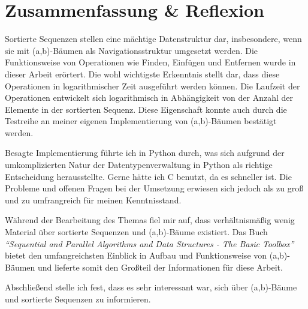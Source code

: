 \chapter{Zusammenfassung \& Reflexion}

Sortierte Sequenzen stellen eine mächtige Datenstruktur dar, insbesondere, wenn sie mit (a,b)-Bäumen als Navigationsstruktur umgesetzt werden. Die Funktionsweise von Operationen wie Finden, Einfügen und Entfernen wurde in dieser Arbeit erörtert. Die wohl wichtigste Erkenntnis stellt dar, dass diese Operationen in logarithmischer Zeit ausgeführt werden können. Die Laufzeit der Operationen entwickelt sich logarithmisch in Abhängigkeit von der Anzahl  der Elemente in der sortierten Sequenz. Diese Eigenschaft konnte auch durch die Testreihe an meiner eigenen Implementierung von (a,b)-Bäumen bestätigt werden.
\par
Besagte Implementierung führte ich in Python durch, was sich aufgrund der umkomplizierten Natur der Datentypenverwaltung in Python als richtige Entscheidung herausstellte. Gerne hätte ich C benutzt, da es schneller ist. Die Probleme und offenen Fragen bei der Umsetzung erwiesen sich jedoch als zu groß und zu umfrangreich für meinen Kenntnisstand.
\par
Während der Bearbeitung des Themas fiel mir auf, dass verhältnismäßig wenig Material über sortierte Sequenzen und (a,b)-Bäume existiert. Das Buch \textit{"`Sequential and Parallel Algorithms and Data Structures - The Basic Toolbox"'} \cite{Sanders:19} bietet den umfangreichsten Einblick in Aufbau und Funktionsweise von (a,b)-Bäumen und lieferte somit den Großteil der Informationen für diese Arbeit.
\par
Abschließend stelle ich fest, dass es sehr interessant war, sich über (a,b)-Bäume und sortierte Sequenzen zu informieren.
